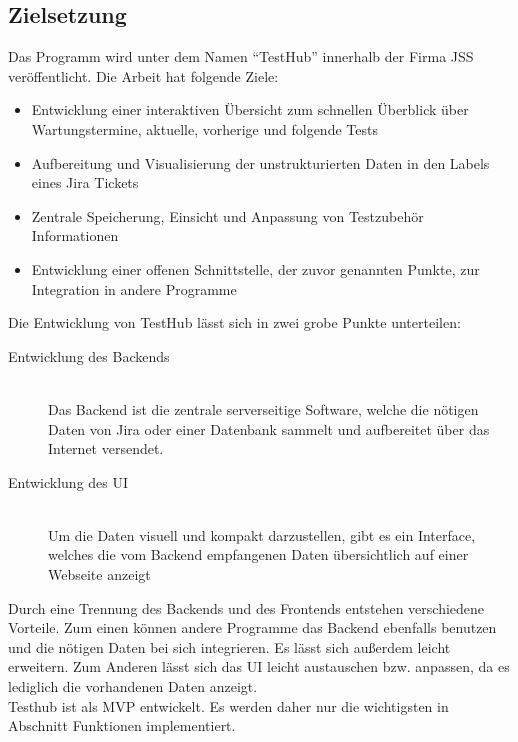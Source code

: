 \subsection{Zielsetzung}
Das Programm wird unter dem Namen ``TestHub'' innerhalb der Firma \gls{JSS} 
veröffentlicht. Die Arbeit hat folgende Ziele:

\begin{itemize}
\item Entwicklung einer interaktiven Übersicht zum schnellen Überblick über Wartungstermine, aktuelle, vorherige und folgende Tests 
\item Aufbereitung und Visualisierung der unstrukturierten Daten in den Labels eines \gls{Jira} Tickets
\item Zentrale Speicherung, Einsicht und Anpassung von Testzubehör Informationen
\item Entwicklung einer offenen Schnittstelle, der zuvor genannten Punkte, zur Integration in andere Programme

\end{itemize}

Die Entwicklung von TestHub lässt sich in zwei grobe Punkte unterteilen:

\begin{description}

    \item[Entwicklung des Backends]\hfill \\
    Das Backend ist die zentrale serverseitige Software, welche die nötigen 
    Daten von \gls{Jira} oder einer Datenbank sammelt und aufbereitet über das Internet 
    versendet.
    

    \item[Entwicklung des UI]\hfill \\
    Um die Daten visuell und kompakt darzustellen, gibt es ein Interface, 
    welches die vom Backend empfangenen Daten übersichtlich auf einer Webseite
    anzeigt

\end{description}


Durch eine Trennung des Backends und des \gls{Frontend}s entstehen verschiedene 
Vorteile. Zum einen können andere Programme das Backend ebenfalls benutzen und
die nötigen Daten bei sich integrieren. Es lässt sich außerdem leicht erweitern.
Zum Anderen lässt sich das \gls{UI} leicht austauschen bzw. anpassen, da es lediglich 
die vorhandenen Daten anzeigt. \\

Testhub ist als \gls{MVP} entwickelt. Es werden daher nur die wichtigsten in 
Abschnitt Funktionen implementiert.


